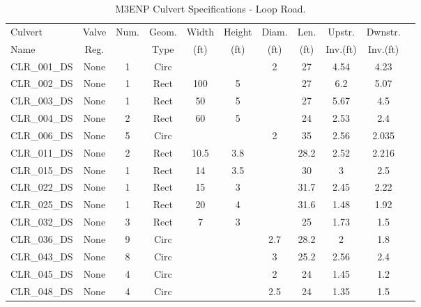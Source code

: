 \begin{table}[]
\caption{M3ENP Culvert Specifications - Loop Road.}
\label{tab:culv-specs-CLR}
\begin{tabular}{@{}lcccccccccc@{}}
\toprule
Culvert       & Valve      & Num.     & Geom.& Width  & Height & Diam.    & Len.   & Upstr.    & Dwnstr.    \\
Name          & Reg.       &          & Type & (ft)   & (ft)   & (ft)     & (ft)   & Inv.(ft)  & Inv.(ft)   \\
\midrule
CLR\_001\_DS  & None       & 1        & Circ &        &       & 2        & 27     & 4.54      & 4.23       \\
CLR\_002\_DS  & None       & 1        & Rect & 100    & 5     &          & 27     & 6.2       & 5.07       \\
CLR\_003\_DS  & None       & 1        & Rect & 50     & 5     &          & 27     & 5.67      & 4.5        \\
CLR\_004\_DS  & None       & 2        & Rect & 60     & 5     &          & 24     & 2.53      & 2.4        \\
CLR\_006\_DS  & None       & 5        & Circ &        &       & 2        & 35     & 2.56      & 2.035      \\
CLR\_011\_DS  & None       & 2        & Rect & 10.5   & 3.8   &          & 28.2   & 2.52      & 2.216      \\
CLR\_015\_DS  & None       & 1        & Rect & 14     & 3.5   &          & 30     & 3         & 2.5        \\
CLR\_022\_DS  & None       & 1        & Rect & 15     & 3     &          & 31.7   & 2.45      & 2.22       \\
CLR\_025\_DS  & None       & 1        & Rect & 20     & 4     &          & 31.6   & 1.48      & 1.92       \\
CLR\_032\_DS  & None       & 3        & Rect & 7      & 3     &          & 25     & 1.73      & 1.5        \\
CLR\_036\_DS  & None       & 9        & Circ &        &       & 2.7      & 28.2   & 2         & 1.8        \\
CLR\_043\_DS  & None       & 8        & Circ &        &       & 3        & 25.2   & 2.56      & 2.4        \\
CLR\_045\_DS  & None       & 4        & Circ &        &       & 2        & 24     & 1.45      & 1.2        \\
CLR\_048\_DS  & None       & 4        & Circ &        &       & 2.5      & 24     & 1.35      & 1.5        \\

\end{tabular}
\end{table}
